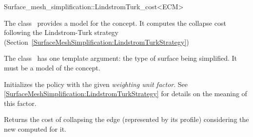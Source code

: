 

\begin{ccRefFunctionObjectClass}{Surface_mesh_simplification::LindstromTurk_cost<ECM>}


\ccDefinition

The class \ccRefName\ provides a model for the  concept.
It computes the collapse cost following the Lindstrom-Turk strategy
(Section~\ref{SurfaceMeshSimplification:LindstromTurkStrategy})

The class \ccRefName\ has one template argument: the type of surface being simplified. 
It must be a model of the  concept.


\ccIsModel
{}

\ccCreation
{}
{Initializes the policy with the given {\em weighting unit factor}.
See \ref{SurfaceMeshSimplification:LindstromTurkStrategy} for details on the meaning of this factor.} 

\ccTagFullDeclarations
{}
  {Returns the cost of collapsing the edge (represented by its profile) considering 
  the new  computed for it.}

\ccSeeAlso
{}

\end{ccRefFunctionObjectClass}


